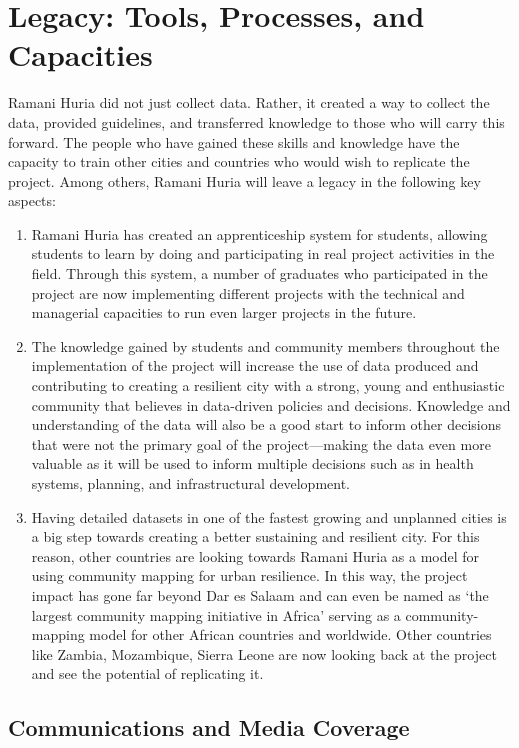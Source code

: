 \documentclass[a4paper,12pt,twoside]{article}
\begin{document}
\section{Legacy: Tools, Processes, and Capacities}

Ramani Huria did not just collect data. Rather, it created a way to collect the data, provided guidelines, and transferred knowledge to those who will carry this forward. The people who have gained these skills and knowledge have the capacity to train other cities and countries who would wish to replicate the project. Among others, Ramani Huria will leave a legacy in the following key aspects:
\begin{enumerate}
    \item Ramani Huria has created an apprenticeship system for students, allowing students to learn by doing and participating in real project activities in the field. Through this system, a number of graduates who participated in the project are now implementing different projects with the technical and managerial capacities to run even larger projects in the future.
    \item The knowledge gained by students and community members throughout the implementation of the project will increase the use of data produced and contributing to creating a resilient city with a strong, young and enthusiastic community that believes in data-driven policies and decisions. Knowledge and understanding of the data will also be a good start to inform other decisions that were not the primary goal of the project---making the data even more valuable as it will be used to inform multiple decisions such as in health systems, planning, and infrastructural development.
    \item Having detailed datasets in one of the fastest growing and unplanned cities is a big step towards creating a better sustaining and resilient city. For this reason, other countries are looking towards Ramani Huria as a model for using community mapping for urban resilience. In this way, the project impact has gone far beyond Dar es Salaam and can even be named as  ‘the largest community mapping initiative in Africa’ serving as a community-mapping model for other African countries and worldwide. Other countries like Zambia, Mozambique, Sierra Leone are now looking back at the project and see the potential of replicating it.

\end{enumerate}

\subsection{Communications and Media Coverage}
\end{document}
